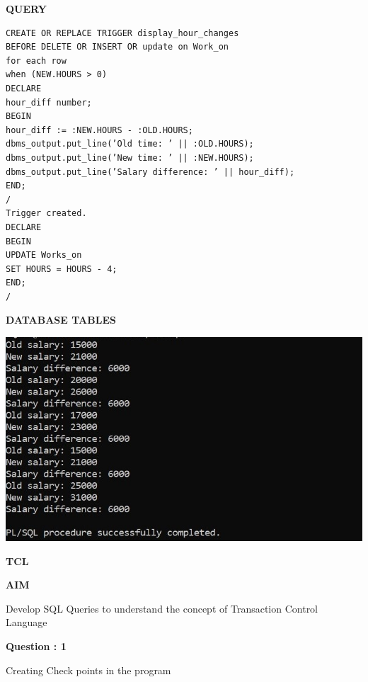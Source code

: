 \documentclass[a4paper,12pt]{report}
\begin{document}
\begin{flushleft}
\textbf{QUERY }
\end{flushleft}
 \begin{verbatim}
CREATE OR REPLACE TRIGGER display_hour_changes
BEFORE DELETE OR INSERT OR update on Work_on
for each row
when (NEW.HOURS > 0)
DECLARE
hour_diff number;
BEGIN
hour_diff := :NEW.HOURS - :OLD.HOURS;
dbms_output.put_line(’Old time: ’ || :OLD.HOURS);
dbms_output.put_line(’New time: ’ || :NEW.HOURS);
dbms_output.put_line(’Salary difference: ’ || hour_diff);
END;
/
Trigger created.
DECLARE
BEGIN
UPDATE Works_on
SET HOURS = HOURS - 4;
END;
/
\end{verbatim}
\begin{flushleft}
\textbf{DATABASE TABLES}
\end{flushleft}
\includegraphics[scale=1]{trigger2.jpg}

\newpage
\begin{center}
\large\textbf{TCL}
\end{center}

\begin{flushleft}
\textbf{AIM }
\end{flushleft}
Develop SQL Queries to understand the concept of Transaction Control Language

\begin{flushleft}
    \textbf{Question : 1}
\end{flushleft}
Creating Check points in the program
\end{document}
